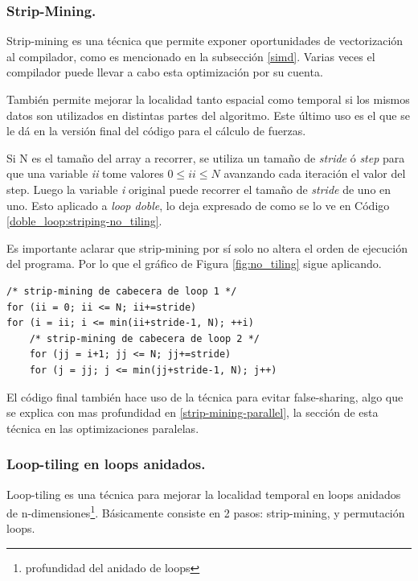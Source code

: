 \documentclass{article}
\begin{document}
\subsubsection{Strip-Mining.\label{strip-mining}}
Strip-mining es una técnica que permite exponer oportunidades de vectorización al compilador, como es mencionado
en la subsección \ref{simd}. Varias veces el compilador puede llevar a cabo esta optimización por su cuenta.


También permite mejorar la localidad tanto espacial como temporal si los mismos datos son utilizados en distintas partes
del algoritmo. Este último uso es el que se le dá en la versión final del código para el cálculo de fuerzas.


Si N es el tamaño del array a recorrer, se utiliza un tamaño de \textit{stride} ó \textit{step} para que una variable \textit{ii}
tome valores $0\leq{ii}\leq N$ avanzando cada iteración el valor del step. Luego la variable \textit{i} original puede recorrer
el tamaño de \textit{stride} de uno en uno. Esto aplicado a \textit{loop doble}, lo deja expresado de como se lo ve en
Código \ref{doble_loop:striping-no_tiling}.

Es importante aclarar que strip-mining por sí solo no altera el orden de ejecución del programa. Por lo
que el gráfico de Figura \ref{fig:no_tiling} sigue aplicando.

\begin{lstlisting}[style=CStyle,label=doble_loop:striping-no_tiling,caption=doble loop con strip-mining en ambos loops.]
/* strip-mining de cabecera de loop 1 */
for (ii = 0; ii <= N; ii+=stride)
for (i = ii; i <= min(ii+stride-1, N); ++i)
	/* strip-mining de cabecera de loop 2 */
	for (jj = i+1; jj <= N; jj+=stride)
	for (j = jj; j <= min(jj+stride-1, N); j++)
\end{lstlisting}


El código final también hace uso de la técnica para evitar false-sharing, algo que se explica con mas profundidad
en \ref{strip-mining-parallel}, la sección de esta técnica en las optimizaciones paralelas.

\subsubsection{Loop-tiling en loops anidados.\label{loop-tiling}}

Loop-tiling es una técnica para mejorar la localidad temporal en loops anidados de
n-dimensiones\footnote{profundidad del anidado de loops}. Básicamente consiste en 2 pasos: strip-mining, y permutación loops.
\end{document}
